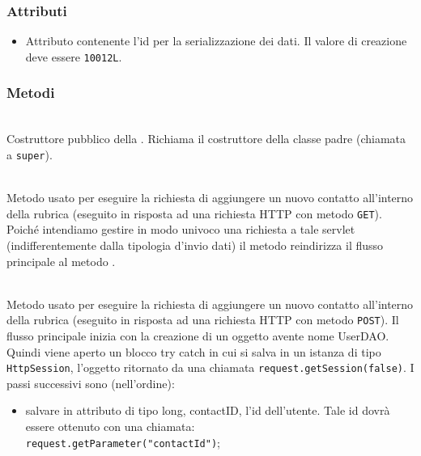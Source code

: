 \subsubsection*{Attributi}

\begin{itemize}
	\item{}
	Attributo contenente l'id per la serializzazione dei dati. Il valore di creazione deve essere \texttt{10012L}.
\end{itemize}

\subsubsection*{Metodi}

\begin{description}
	\item{}\\
	Costruttore pubblico della . Richiama il costruttore della classe padre (chiamata a \texttt{super}).
	
	\item{}\\
	Metodo usato per eseguire la richiesta di aggiungere un nuovo contatto all'interno della rubrica (eseguito in risposta ad una richiesta HTTP con metodo \texttt{GET}). Poiché intendiamo gestire in modo univoco una richiesta a tale servlet (indifferentemente dalla tipologia d'invio dati) il metodo reindirizza il flusso principale al metodo .
	
	\item{}\\	
	Metodo usato per eseguire la richiesta di aggiungere un nuovo contatto all'interno della rubrica (eseguito in risposta ad una richiesta HTTP con metodo \texttt{POST}). Il flusso principale inizia  con la creazione di un oggetto  avente nome UserDAO. Quindi viene aperto un blocco try catch in cui si salva in un istanza di tipo \texttt{HttpSession}, l'oggetto ritornato da una chiamata \verb|request.getSession(false)|. I passi successivi sono (nell'ordine):
	\begin{itemize}
		\item salvare in attributo di tipo long, contactID, l'id dell'utente. Tale id dovrà essere ottenuto con una chiamata:\\
		\verb|request.getParameter("contactId")|;\\
		

\end{itemize}
\end{description}
